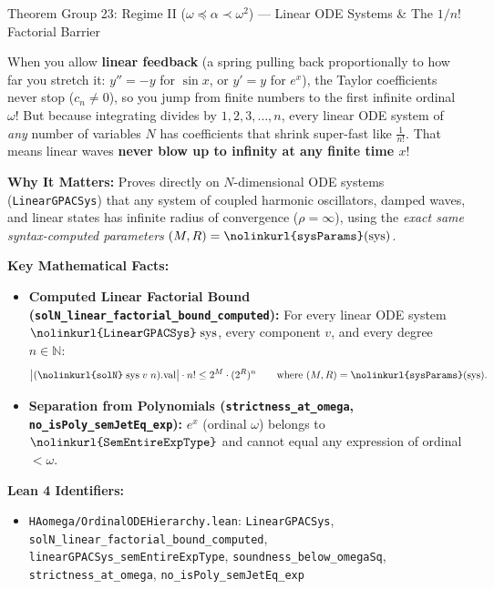 \documentclass[11pt,a4paper]{article}
\newcommand{\N}{\ensuremath{\mathbb{N}}}
\newcommand{\lean}[1]{\texttt{\nolinkurl{#1}}}
\begin{document}
\vspace{6pt}

\begin{thmcard}{Theorem Group 23: Regime II (\texorpdfstring{$\omega \preceq \alpha \prec \omega^2$}{omega <= alpha < omega\^2}) --- Linear ODE Systems \& The \texorpdfstring{$1/n!$}{1/n!} Factorial Barrier}
\begin{eli5box}
When you allow \textbf{linear feedback} (a spring pulling back proportionally to how far you stretch it: $y'' = -y$ for $\sin x$, or $y' = y$ for $e^x$), the Taylor coefficients never stop ($c_n \neq 0$), so you jump from finite numbers to the first infinite ordinal $\omega$! But because integrating divides by $1, 2, 3, \dots, n$, every linear ODE system of \emph{any} number of variables $N$ has coefficients that shrink super-fast like $\frac{1}{n!}$. That means linear waves \textbf{never blow up to infinity at any finite time $x$}!
\end{eli5box}

\textbf{Why It Matters:}
Proves directly on $N$-dimensional ODE systems (\lean{LinearGPACSys}) that any system of coupled harmonic oscillators, damped waves, and linear states has infinite radius of convergence ($\rho = \infty$), using the \emph{exact same syntax-computed parameters} $(M, R) = \lean{sysParams}(\mathrm{sys})$.

\textbf{Key Mathematical Facts:}
\begin{itemize}
  \item \textbf{Computed Linear Factorial Bound (\lean{solN_linear_factorial_bound_computed}):} For every linear ODE system $\lean{LinearGPACSys}\;\mathrm{sys}$, every component $v$, and every degree $n \in \N$:
  \[
    \bigl|(\lean{solN}\;\mathrm{sys}\;v\;n).\mathrm{val}\bigr| \cdot n! \le 2^M \cdot (2^R)^n \qquad \text{where } (M, R) = \lean{sysParams}(\mathrm{sys}).
  \]
  \item \textbf{Separation from Polynomials (\lean{strictness_at_omega}, \lean{no_isPoly_semJetEq_exp}):} $e^x$ (ordinal $\omega$) belongs to $\lean{SemEntireExpType}$ and cannot equal any expression of ordinal $< \omega$.
\end{itemize}

\textbf{Lean 4 Identifiers:}
\begin{itemize}
  \item \lean{HAomega/OrdinalODEHierarchy.lean}: \lean{LinearGPACSys}, \lean{solN_linear_factorial_bound_computed}, \lean{linearGPACSys_semEntireExpType}, \lean{soundness_below_omegaSq}, \lean{strictness_at_omega}, \lean{no_isPoly_semJetEq_exp}
\end{itemize}
\end{thmcard}
\end{document}
